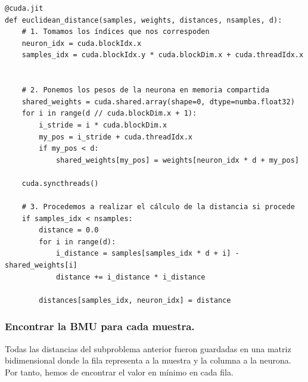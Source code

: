 \begin{code}
\begin{verbatim}
@cuda.jit
def euclidean_distance(samples, weights, distances, nsamples, d):
    # 1. Tomamos los índices que nos correspoden
    neuron_idx = cuda.blockIdx.x
    samples_idx = cuda.blockIdx.y * cuda.blockDim.x + cuda.threadIdx.x
    
    
    # 2. Ponemos los pesos de la neurona en memoria compartida
    shared_weights = cuda.shared.array(shape=0, dtype=numba.float32)
    for i in range(d // cuda.blockDim.x + 1):
        i_stride = i * cuda.blockDim.x
        my_pos = i_stride + cuda.threadIdx.x
        if my_pos < d:
            shared_weights[my_pos] = weights[neuron_idx * d + my_pos]
            
    cuda.syncthreads()
    
    # 3. Procedemos a realizar el cálculo de la distancia si procede
    if samples_idx < nsamples:
        distance = 0.0
        for i in range(d):
            i_distance = samples[samples_idx * d + i] - shared_weights[i]
            distance += i_distance * i_distance
            
        distances[samples_idx, neuron_idx] = distance
\end{verbatim}
\label{code:euclideandistance}
\end{code}

\subsubsection{Encontrar la BMU para cada muestra.}
Todas las distancias del subproblema anterior fueron guardadas en una matriz bidimensional donde la fila representa a la muestra y la columna a la neurona. Por tanto, hemos de encontrar el valor en mínimo en cada fila. \\



